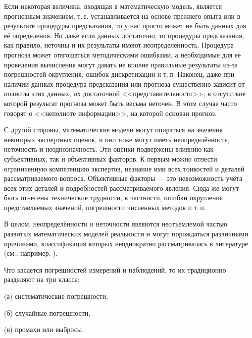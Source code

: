 \documentclass[a5paper,openany]{book}
\begin{document}
Если некоторая величина, входящая в математическую модель, является прогнозным 
значением, т.\,е. устанавливается на основе прежнего опыта или в результате процедуры 
предсказания, то у нас просто может не быть данных для её определения. Но даже если 
данных достаточно, то процедуры предсказания, как правило, неточны и их результаты 
имеют неопределённость. Процедура прогноза может отягощаться методическими ошибками, 
а необходимые для её проведения вычисления могут давать не вполне правильные результаты 
из-за погрешностей округления, ошибок дискретизации и т.\,п. Наконец, даже при наличии 
данных процедура предсказания или прогноза существенно зависит от полноты этих данных, 
их достаточной <<представительности>>, в отсутствие которой результат прогноза может 
быть весьма неточен. В этом случае часто говорят о <<неполноте информации>>, на которой 
основан прогноз. 
   
С другой стороны, математические модели могут опираться на значения некоторых экспертных 
оценок, и они тоже могут иметь неопределённость, неточность и неоднозначность. Эти оценки 
подвержены влиянию как субъективных, так и объективных факторов. К первым можно отнести 
ограниченную компетенцию экспертов, незнание ими всех тонкостей и деталей рассматриваемого 
вопроса. Объективные факторы --- это невозможность учёта всех этих деталей и подробностей 
рассматриваемого явления. Сюда же могут быть отнесены технические трудности, в частности, 
ошибки округления представляемых значений, погрешности численных методов и т.\,п.  
  
В целом, неопределённости и неточности являются неотъемлемой частью развитых 
математических моделей реальности и могут порождаться различными причинами, 
классификация которых неоднократно рассматривалась в литературе (см., например, 
\cite{VoschininIMRO, Malikov, NovitskiZograf, Rabinovich1978, NguyenKreinWuXiang, 
Rabinovich2005}). 
  
Что касается погрешностей измерений и наблюдений, то их традиционно разделяют 
на три класса:  
\begin{list}{}{\leftmargin=14mm\itemsep=5pt\topsep=4pt\parsep=0pt} 
\item[(а)] 
систематические погрешности, 
\item[(б)] 
случайные погрешности, 
\item[(в)] 
промахи или выбросы.  
\end{list} 
   
\end{document}
